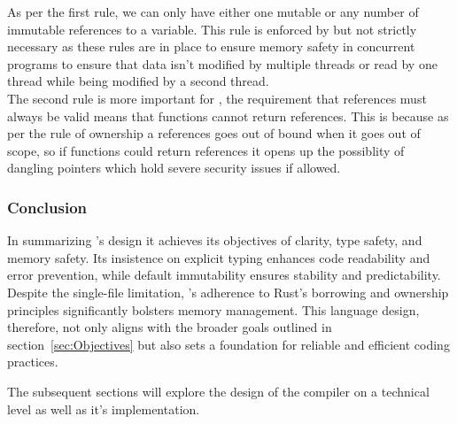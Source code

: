 As per the first rule, we can only have either one mutable or any number of immutable references to a
variable. This rule is enforced by \lang{} but not strictly necessary as these rules
are in place to ensure memory safety in concurrent programs to ensure that data isn't
modified by multiple threads or read by one thread while being modified by a second
thread. \\

The second rule is more important for \lang{}, the requirement that references must
always be valid means that functions cannot return references. This is because as per
the rule of ownership a references goes out of bound when it goes out of scope, so if
functions could return references it opens up the possiblity of dangling pointers
which hold severe security issues if allowed.

\subsubsection{Conclusion}
\label{sec:LangDesignConlusion}

In summarizing \lang{}'s design it achieves its objectives of clarity, type safety, and
memory safety. Its insistence on explicit typing enhances code readability and error
prevention, while default immutability ensures stability and predictability. Despite
the single-file limitation, \lang{}'s adherence to Rust's borrowing and ownership
principles significantly bolsters memory management. This language design, therefore,
not only aligns with the broader goals outlined in section~\ref{sec:Objectives} but
also sets a foundation for reliable and efficient coding practices.

The subsequent sections will explore the design of the compiler on a technical level
as well as it's implementation.
